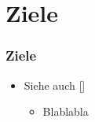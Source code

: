 \section{Ziele}
%
\begin{frame}
	\frametitle{Ziele}
	\begin{itemize}
		\item Siehe auch [\cite{Silverman86}]
		\begin{itemize}
			\item Blablabla
 		\end{itemize}
	\end{itemize}
\end{frame}
